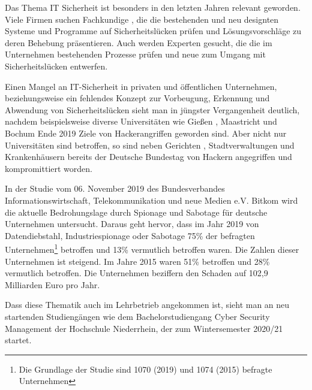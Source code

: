 \label{chap_text:Einleitung}
Das Thema IT Sicherheit ist besonders in den letzten Jahren relevant geworden. Viele Firmen suchen Fachkundige \cite{it-daily.netITSecurityExpertenWerdenHanderingend2019}, die die bestehenden und neu designten Systeme und Programme auf Sicherheitslücken prüfen und Lösungsvorschläge zu deren Behebung präsentieren. Auch werden Experten gesucht, die die im Unternehmen bestehenden Prozesse prüfen und neue zum Umgang mit Sicherheitslücken entwerfen.

Einen Mangel an IT-Sicherheit in privaten und öffentlichen Unternehmen, beziehungsweise ein fehlendes Konzept zur Vorbeugung, Erkennung und Abwendung von Sicherheitslücken sieht man in jüngster Vergangenheit deutlich, nachdem beispielsweise diverse Universitäten wie Gießen \cite{schirmacherUniGiessenNaehert2020}, Maastricht \cite{wdrCyberattackeHackerangriffAuf2019} und Bochum \cite{ruhr24HackerAngriffLegtITSysteme2020} Ende 2019 Ziele von Hackerangriffen geworden sind. Aber nicht nur Universitäten sind betroffen, so sind neben Gerichten \cite{hurtzHackerAngriffAufGericht2020}, Stadtverwaltungen \cite{barsigCyberAttackeAufPotsdamer2020} und Krankenhäusern \cite{wellbrockITSicherheitImKrankenhaus2019} bereits der Deutsche Bundestag von Hackern angegriffen und kompromittiert worden. \cite{fladeCyberangriffAufBundestag2020}

In der Studie  vom 06. November 2019 des Bundesverbandes Informationswirtschaft, Telekommunikation und neue Medien e.V. Bitkom wird die aktuelle Bedrohungslage durch Spionage und Sabotage für deutsche Unternehmen untersucht. Daraus geht hervor, dass im Jahr 2019 von Datendiebstahl, Industriespionage oder Sabotage 75\% der befragten Unternehmen\footnote{Die Grundlage der Studie sind 1070 (2019) und 1074 (2015) befragte Unternehmen} betroffen  und 13\% vermutlich betroffen waren. Die Zahlen dieser Unternehmen ist steigend. Im Jahre 2015 waren  51\% betroffen und 28\% vermutlich betroffen. Die Unternehmen beziffern den Schaden auf 102,9 Milliarden Euro pro Jahr. \cite{bergWirtschaftsschutzDigitalenWelt2019}

Dass diese Thematik auch im Lehrbetrieb angekommen ist, sieht man an neu startenden Studiengängen wie dem Bachelorstudiengang Cyber Security Management der Hochschule Niederrhein, der zum Wintersemester 2020/21 startet. \cite{hochschuleniederrheinHackernRoteKarte2020}

